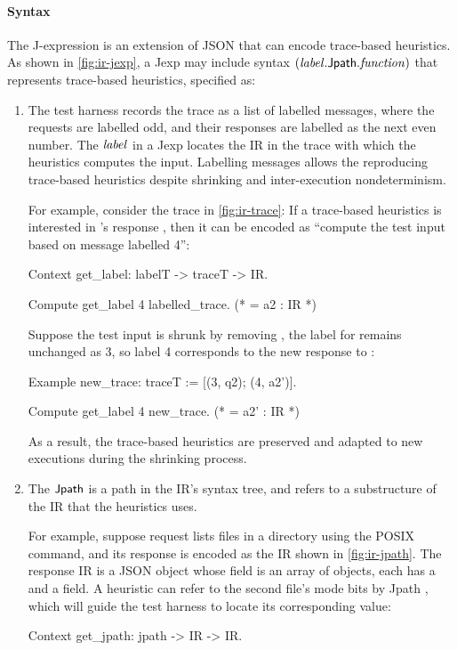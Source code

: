 \paragraph{Syntax}
The J-expression is an extension of JSON that can encode trace-based heuristics.
As shown in \autoref{fig:ir-jexp}, a Jexp may include syntax
$(\mathit{label}.\mathsf{Jpath}.\mathit{function})$ that represents trace-based heuristics, specified as:
\begin{enumerate}
\item The test harness records the trace as a list of labelled messages, where
  the requests are labelled odd, and their responses are labelled as the next
  even number.  The $\mathit{label}$ in a Jexp locates the IR in the trace with which
  the heuristics computes the input.  Labelling messages allows the reproducing
  trace-based heuristics despite shrinking and inter-execution nondeterminism.

  For example, consider the trace in \autoref{fig:ir-trace}: If a trace-based
  heuristics is interested in 's response , then it can be
  encoded as ``compute the test input based on message labelled 4'':
\begin{coq}
  Context get_label: labelT -> traceT -> IR.

  Compute get_label 4 labelled_trace.
  (* = a2 : IR *)
\end{coq}
  
  Suppose the test input is shrunk by removing , the label for 
  remains unchanged as 3, so label 4 corresponds to the new response to
  :
\begin{coq}
  Example new_trace: traceT :=
    [(3, q2); (4, a2')].

  Compute get_label 4 new_trace.
  (* = a2' : IR *)
\end{coq}

As a result, the trace-based heuristics are preserved and adapted to new
executions during the shrinking process.
\item The $\mathsf{Jpath}$ is a path in the IR's syntax tree, and refers to a
  substructure of the IR that the heuristics uses.

  For example, suppose request  lists files in a directory using the
  POSIX  command, and its response  is encoded as the IR
  shown in \autoref{fig:ir-jpath}.  The response IR is a JSON object whose
   field is an array of objects, each has a 
  and a  field.  A heuristic can refer to the second file's
  mode bits by Jpath , which will guide the test
  harness to locate its corresponding value:
\begin{coq}
  Context get_jpath: jpath -> IR -> IR.


\end{coq}
\end{enumerate}
